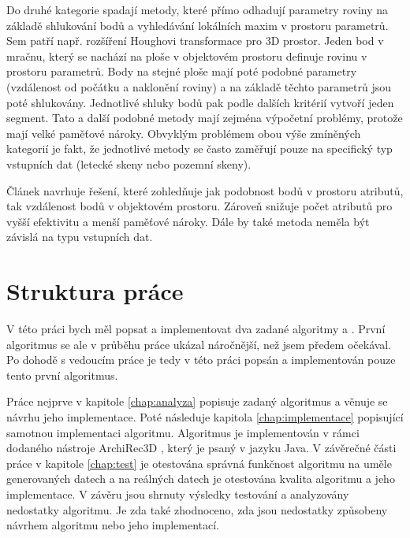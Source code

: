 \documentclass[11pt,twoside,a4paper]{book}
\begin{document}
Do druhé kategorie spadají metody, které přímo odhadují parametry roviny na základě shlukování bodů a vyhledávání lokálních maxim v prostoru parametrů. Sem patří např. rozšíření Houghovi transformace pro 3D prostor. Jeden bod v mračnu, který se nachází na ploše v objektovém prostoru definuje rovinu v prostoru parametrů. Body na stejné ploše mají poté podobné parametry (vzdálenost od počátku a naklonění roviny) a na základě těchto parametrů jsou poté shlukovány. Jednotlivé shluky bodů pak podle dalších kritérií vytvoří jeden segment. Tato a další podobné metody mají zejména výpočetní problémy, protože mají velké paměťové nároky. Obvyklým problémem obou výše zmíněných kategorií je fakt, že jednotlivé metody se často zaměřují pouze na specifický typ vstupních dat (letecké skeny nebo pozemní skeny).

Článek \cite{Seg01} navrhuje řešení, které zohledňuje jak podobnost bodů v prostoru atributů, tak vzdálenost bodů v objektovém prostoru. Zároveň snižuje počet atributů pro vyšší efektivitu a menší paměťové nároky. Dále by také metoda neměla být závislá na typu vstupních dat.


\section{Struktura práce}

V této práci bych měl popsat a implementovat dva zadané algoritmy \cite{Seg01} a \cite{Seg02}. První algoritmus se ale v průběhu práce ukázal náročnější, než jsem předem očekával. Po dohodě s vedoucím práce je tedy v této práci popsán a implementován pouze tento první algoritmus.  

Práce nejprve v kapitole \ref{chap:analyza} popisuje zadaný algoritmus \cite{Seg01} a věnuje se návrhu jeho implementace. Poté následuje kapitola \ref{chap:implementace} popisující samotnou implementaci algoritmu. Algoritmus je implementován v rámci dodaného nástroje ArchiRec3D \cite{AR3D}, který je psaný v jazyku Java. V závěrečné části práce v kapitole \ref{chap:test} je otestována správná funkčnost algoritmu na uměle generovaných datech a na reálných datech je otestována kvalita algoritmu a jeho implementace. V závěru jsou shrnuty výsledky testování a analyzovány nedostatky algoritmu. Je zda také zhodnoceno, zda jsou nedostatky způsobeny návrhem algoritmu nebo jeho implementací.


\end{document}

